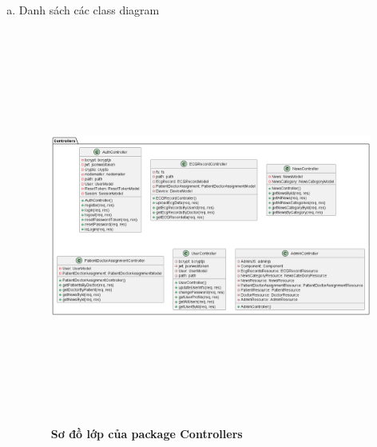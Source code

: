 \begin{enumerate}[a)]
\item Danh sách các class diagram

\begin{figure}[H]
  \centering
  \includegraphics[width=16cm,height=13cm]{Images/server/class/class_controller.png}
  \caption[Sơ đồ lớp của package Controllers]{\bfseries \fontsize{12pt}{0pt}\selectfont Sơ đồ lớp của package Controllers}
  \label{class_controller} %
\end{figure}




\end{enumerate}

